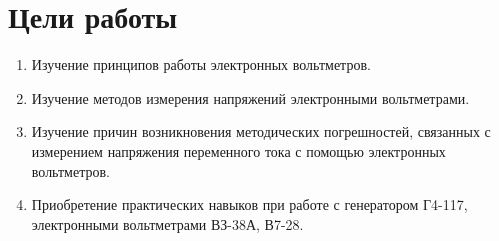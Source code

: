\section{Цели работы}

\begin{enumerate}
  \item Изучение принципов работы электронных вольтметров.
  \item Изучение методов измерения напряжений электронными вольтметрами.
  \item Изучение причин возникновения методических погрешностей, связанных с измерением напряжения переменного тока с помощью электронных вольтметров.
  \item Приобретение практических навыков при работе с генератором Г4-117, электронными вольтметрами ВЗ-38А, В7-28.
\end{enumerate}

